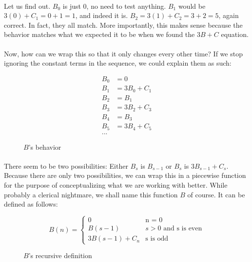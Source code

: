 \documentclass[12pt,letterpaper]{article}
\begin{document}
			\paragraph{} Let us find out. $B_0$ is just 0, no need to test anything. $B_1$ would be $3(0) + C_1 = 0 + 1 = 1$, and indeed it is. $B_2 = 3(1) + C_2 = 3 + 2 = 5$, again correct. In fact, they all match. More importantly, this makes sense because the behavior matches what we expected it to be when we found the $3B + C$ equation.
			
			\paragraph{} Now, how can we wrap this so that it only changes every other time? If we stop ignoring the constant terms in the sequence, we could explain them as such:
			
			\begin{figure}[h]
				\begin{align*}
					B_0 &= 0\\
					B_1 &= 3B_0 + C_1\\
					B_2 &= B_1\\
					B_3 &= 3B_2 + C_3\\
					B_4 &= B_3\\
					B_5 &= 3B_4 +C_5\\
					\text{...}&
				\end{align*}
				
				\caption{$B$'s behavior}
			\end{figure}
		
			\paragraph{} There seem to be two possibilities: Either $B_s$ is $B_{s-1}$ or $B_s$ is $3B_{s-1} + C_s$. Because there are only two possibilities, we can wrap this in a piecewise function for the purpose of conceptualizing what we are working with better. While probably a clerical nightmare, we shall name this function $B$ of course. It can be defined as follows:
			
			\begin{figure}[h]
				\begin{equation*}
					B(n) = \begin{cases}
						0 &\text{n = 0}\\
						B(s - 1) &s > 0 \text{ and s is even}\\
						3B(s - 1) + C_n &\text{s is odd}
					\end{cases}
				\end{equation*}
				
				\caption{$B$'s recursive definition}
				\label{function:bRecursive}
			\end{figure}
		
\end{document}
